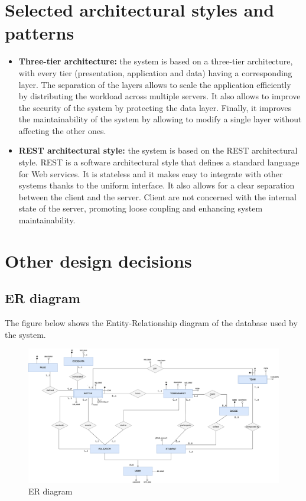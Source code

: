 \section{Selected architectural styles and patterns}

\begin{itemize}
    \item \textbf{Three-tier architecture: }the system is based on a three-tier architecture, with every tier (presentation, application and data) 
    having a corresponding layer. The separation of the layers allows to scale the application efficiently by distributing the workload across 
    multiple servers. It also allows to improve the security of the system by protecting the data layer.
    Finally, it improves the maintainability of the system by allowing to modify a single layer without affecting the other ones.
    \item \textbf{REST architectural style: }the system is based on the REST architectural style. REST is a software architectural style that 
    defines a standard language for Web services. It is stateless and it makes easy to integrate with other systems thanks to the uniform 
    interface. It also allows for a clear separation between the client and the server. Client are not concerned with the internal state of the 
    server, promoting loose coupling and enhancing system maintainability.
\end{itemize}

\section{Other design decisions}

\subsection{ER diagram}
The figure below shows the Entity-Relationship diagram of the database used by the system.\\
\begin{figure}[H]
    \centering
    \includegraphics[width=1\textwidth]{images/ER_diagram.png}
    \caption{ER diagram}
\end{figure}